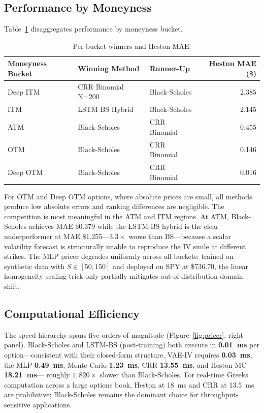 \documentclass[12pt,a4paper]{article}
\begin{document}
\subsection{Performance by Moneyness}

Table~\ref{tab:bucket_winners} disaggregates performance by moneyness bucket.

\begin{table}[H]
  \centering
  \caption{Per-bucket winners and Heston MAE.}
  \label{tab:bucket_winners}
  \renewcommand{\arraystretch}{1.2}
  \begin{tabular}{lllr}
    \toprule
    Moneyness Bucket & Winning Method & Runner-Up & Heston MAE (\$) \\
    \midrule
    Deep ITM  & CRR Binomial N=200 & Black-Scholes & 2.385 \\
    ITM       & LSTM-BS Hybrid     & Black-Scholes & 2.145 \\
    ATM       & Black-Scholes      & CRR Binomial  & 0.455 \\
    OTM       & Black-Scholes      & CRR Binomial  & 0.146 \\
    Deep OTM  & Black-Scholes      & CRR Binomial  & 0.016 \\
    \bottomrule
  \end{tabular}
\end{table}

For OTM and Deep OTM options, where absolute prices are small, all methods
produce low absolute errors and ranking differences are negligible.
The competition is most meaningful in the ATM and ITM regions.
At ATM, Black-Scholes achieves MAE \$0.379 while the LSTM-BS hybrid is the
clear underperformer at MAE \$1.255—$3.3\times$ worse than BS—because a scalar
volatility forecast is structurally unable to reproduce the IV smile at different
strikes.
The MLP pricer degrades uniformly across all buckets: trained on synthetic data
with $S \in [50, 150]$ and deployed on SPY at \$736.70, the linear homogeneity
scaling trick only partially mitigates out-of-distribution domain shift.

\subsection{Computational Efficiency}

The speed hierarchy spans five orders of magnitude
(Figure~\ref{fig:pricer}, right panel).
Black-Scholes and LSTM-BS (post-training) both execute in \textbf{0.01~ms} per
option—consistent with their closed-form structure.
VAE-IV requires \textbf{0.03~ms}, the MLP \textbf{0.49~ms}, Monte Carlo
\textbf{1.23~ms}, CRR \textbf{13.55~ms}, and Heston MC \textbf{18.21~ms}—
roughly $1{,}820\times$ slower than Black-Scholes.
For real-time Greeks computation across a large options book, Heston at 18~ms
and CRR at 13.5~ms are prohibitive; Black-Scholes remains the dominant choice
for throughput-sensitive applications.
\end{document}
